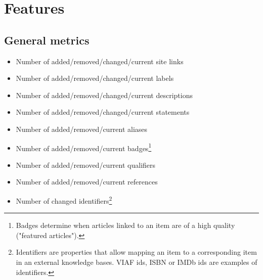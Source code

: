 \documentclass{sig-alternate-2013}
\begin{document}
\section{Features}
\subsection{General metrics}
\begin{itemize}
\item Number of added/removed/changed/current site links
\item Number of added/removed/changed/current labels
\item Number of added/removed/changed/current descriptions
\item Number of added/removed/changed/current statements
\item Number of added/removed/current aliases
\item Number of added/removed/current badges\footnote{Badges determine when articles linked to an item are of a high quality ("featured articles").}
\item Number of added/removed/current qualifiers
\item Number of added/removed/current references
\item Number of changed identifiers\footnote{Identifiers are properties that allow mapping an item to a corresponding item in an external knowledge bases. VIAF ids, ISBN or IMDb ids are examples of identifiers.}
\end{itemize}
\end{document}
